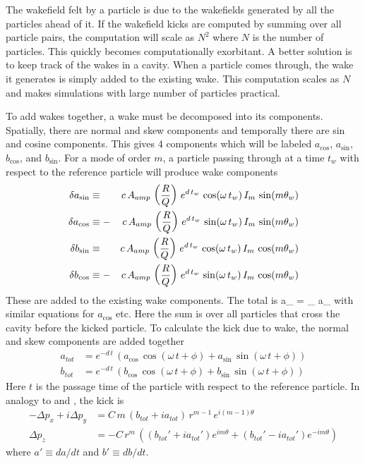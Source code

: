 The wakefield felt by a particle is due to the wakefields generated by all the particles ahead of
it. If the wakefield kicks are computed by summing over all particle pairs, the computation will
scale as $N^2$ where $N$ is the number of particles. This quickly becomes computationally
exorbitant. A better solution is to keep track of the wakes in a cavity. When a particle comes
through, the wake it generates is simply added to the existing wake. This computation scales as $N$
and makes simulations with large number of particles practical.

To add wakes together, a wake must be decomposed into its components.  Spatially, there are normal
and skew components and temporally there are sin and cosine components. This gives 4 components
which will be labeled $a_{\cos}$, $a_{\sin}$, $b_{\cos}$, and $b_{\sin}$. For a mode of order $m$, a
particle passing through at a time $t_w$ with respect to the reference particle will produce wake
components
\begin{alignat}{2}
  \delta a_{\sin} &\equiv  &c \, A_{amp} \, \left( \frac{R}{Q} \right) \,
    e^{d \, t_w} \, \cos (\omega \, t_w) \, I_m \, \sin(m \theta_w) 
    \nonumber \\
  \delta a_{\cos} &\equiv -&c \, A_{amp} \, \left( \frac{R}{Q} \right) \,
    e^{d \, t_w} \, \sin (\omega \, t_w) \, I_m \, \sin(m \theta_w) 
    \label{ac2rq} 
    \\
  \delta b_{\sin} &\equiv  &c \, A_{amp} \, \left( \frac{R}{Q} \right) \,
    e^{d \, t_w} \, \cos (\omega \, t_w) \, I_m \, \cos(m \theta_w) 
    \nonumber \\
  \delta b_{\cos} &\equiv -&c \, A_{amp} \, \left( \frac{R}{Q} \right) \,
    e^{d \, t_w} \, \sin (\omega \, t_w) \, I_m \, \cos(m \theta_w) 
    \nonumber
\end{alignat}
These are added to the existing wake components. The total is
\Begineq
  a_{\sin} = \sum_{} \delta a_{\sin}
\Endeq
with similar equations for $a_{\cos}$ etc. Here the sum is over all particles that cross the
cavity before the kicked particle. To calculate the kick due to wake, the normal and skew components
are added together
\begin{align}
  a_{tot} &= e^{-d \, t} \, \left( 
    a_{\cos} \, \cos (\omega \, t + \phi) + a_{\sin} \, \sin (\omega \, t + \phi) \right) 
    \label{akz2q} \\
  b_{tot} &= e^{-d \, t} \, \left(
    b_{\cos} \, \cos (\omega \, t + \phi) + b_{\sin} \, \sin (\omega \, t + \phi) \right) \nonumber 
\end{align}
Here $t$ is the passage time of the particle with respect to the reference particle. In analogy to
 and , the kick is
\begin{align}
  -\Delta p_x + i\Delta p_y &= C \, 
    m \, (b_{tot} + i a_{tot}) \, r^{m-1} \, e^{i (m-1) \theta} 
    \label{ppcmbar} \\
  \Delta p_z &= -C \, r^m \, \left( 
    (b_{tot}' + i a_{tot}') e^{i m\theta} + (b_{tot}' - i a_{tot}') e^{-i m\theta} \right)
\end{align}
where $a' \equiv da/dt$ and $b' \equiv db/dt$.

